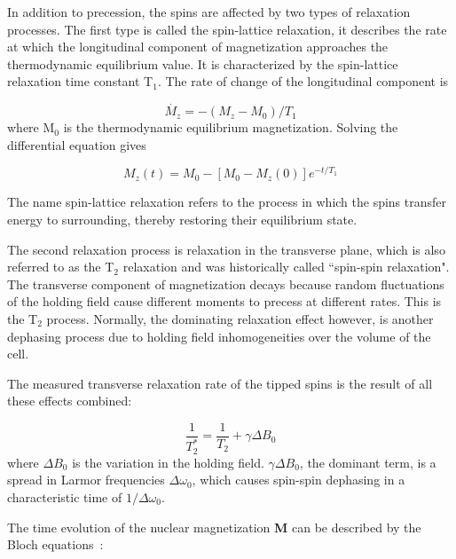 In addition to precession, the spins are affected by two types of relaxation processes. The first type is called the spin-lattice relaxation, it describes the rate at which the longitudinal component of magnetization approaches the thermodynamic equilibrium value. It is characterized by the spin-lattice relaxation time constant T$_{1}$. The rate of change of the longitudinal component is

\begin{equation}
\dot{M_{z}}=-(M_{z}-M_{0})/T_{1}
\end{equation}
where M$_{0}$ is the thermodynamic equilibrium magnetization. Solving the differential equation gives

\begin{equation}
M_{z}(t)=M_{0}-\left[M_{0}-M_{z}(0)\right]e^{-t/T_{1}}
\end{equation}

The name spin-lattice relaxation refers to the process in which the spins transfer energy to surrounding, thereby restoring their equilibrium state.

The second relaxation process is relaxation in the transverse plane, which is also referred to as the T$_{2}$ relaxation and was historically called ``spin-spin relaxation". The transverse component of magnetization decays because random fluctuations of the holding field cause different moments to precess at different rates. This is the T$_{2}$ process. Normally, the dominating relaxation effect however, is another dephasing process due to holding field inhomogeneities over the volume of the cell. 

The measured transverse relaxation rate of the tipped spins is the result of all these effects combined:

\begin{equation}
\frac{1}{T_{2}^{*}}=\frac{1}{T_{2}}+\gamma \Delta B_{0}
\end{equation}
where $\Delta B_{0}$ is the variation in the holding field. $\gamma \Delta B_{0}$, the dominant term, is a spread in Larmor frequencies $\Delta \omega_{0}$, which causes spin-spin dephasing in a characteristic time of $1/\Delta \omega_{0}$. 

The time evolution of the nuclear magnetization {\bf M} can be described by the Bloch equations~\cite{PhysRev.70.460}:


